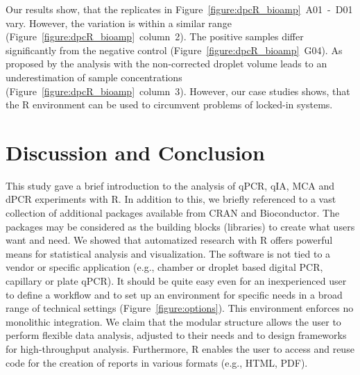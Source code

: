 Our results show, that the replicates in 
Figure~\ref{figure:dpcR_bioamp}~A01~-~D01 vary. However, the variation is 
within 
a similar range (Figure~\ref{figure:dpcR_bioamp}~column~2). The positive 
samples 
differ significantly from the negative control 
(Figure~\ref{figure:dpcR_bioamp}~G04). As proposed by \citet{corbisier_2015} 
the 
analysis with the non-corrected droplet volume leads to an underestimation of 
sample concentrations (Figure~\ref{figure:dpcR_bioamp}~column~3). However, our 
case studies shows, that the R environment can be used to circumvent problems of 
locked-in systems.

\section{Discussion and Conclusion}

This study gave a brief introduction to the analysis of qPCR, qIA, MCA and dPCR 
experiments with R. In addition to this, we briefly referenced to a vast 
collection of additional packages available from CRAN and Bioconductor. The 
packages may be considered as the building blocks (libraries) to create what 
users want and need. We showed that automatized research with R offers powerful 
means for statistical analysis and visualization. The software is not tied to a 
vendor or specific application (e.g., chamber or droplet based digital PCR, 
capillary or plate qPCR). It should be quite easy even for an inexperienced user 
to define a workflow and to set up an environment for specific needs in a broad 
range of technical settings (Figure~\ref{figure:options}). This environment enforces no 
monolithic integration. We claim that the modular structure allows 
the user to perform flexible data analysis, adjusted to their needs and to 
design frameworks for high-throughput analysis. Furthermore, R enables the user 
to access and reuse code for the creation of reports in various formats (e.g., 
HTML, PDF).

